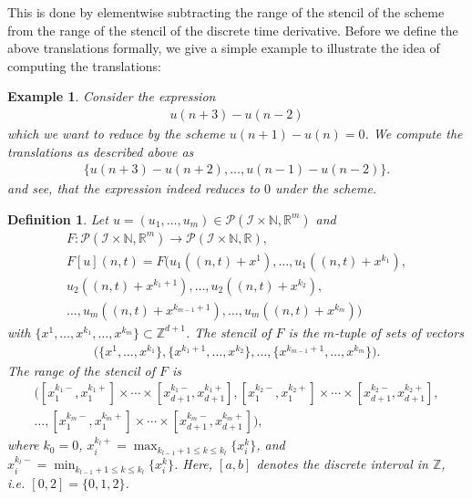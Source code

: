 \documentclass[manuscript]{acmart}
\newcommand{\Rr}{{\mathbb{R}}}
\newcommand{\Nn}{{\mathbb{N}}}
\newcommand{\Zz}{{\mathbb{Z}}}
\newcommand{\1}{{\chi}}
\newcommand{\Ii}{{\mathcal{I}}}
\numberwithin{equation}{section}
\theoremstyle{thmlemcorr}
\numberwithin{theorem}{section}
\theoremstyle{thmlemcorr*}
\theoremstyle{defi}
\newtheorem{definition}[theorem]{Definition}
\theoremstyle{remexample}
\newtheorem{example}[theorem]{Example}
\theoremstyle{ass}
\begin{document}
This is done by elementwise subtracting the range of the stencil of the scheme from the range of the stencil of the discrete time derivative. Before we define the above translations formally, we give a simple example to illustrate the idea of computing the translations:
\begin{example}
	Consider the expression
	\begin{gather*}
		u(n+3)-u(n-2)
	\end{gather*}
	which we want to reduce by the scheme $u(n+1)-u(n)=0$. We compute the translations as described above as
	\begin{gather*}
		\{u(n+3)-u(n+2),\dots,u(n-1)-u(n-2)\}.
	\end{gather*}
	and see, that the expression indeed reduces to $0$ under the scheme.
\end{example}
\begin{definition}
		Let $u=(u_1,\ldots,u_m)\in\mathcal{P}(\Ii\times\Nn,\Rr^m)$ and
		\begin{gather*}
			F:
				\mathcal{P}(\Ii\times\Nn,\Rr^m)\rightarrow\mathcal{P}(\Ii\times\Nn,\Rr),\\
				F[u](n,t)=F(u_1((n,t)+x^1),\ldots,u_1((n,t)+x^{k_1}),\\
				u_2((n,t)+x^{k_1+1}),
				\ldots,u_2((n,t)+x^{k_2}),\\
				\ldots,
				u_m((n,t)+x^{k_{m-1}+1}),\ldots,u_m((n,t)+x^{k_m}))
		\end{gather*}
	\normalsize
	with $\{x^1,\ldots,x^{k_1},\ldots,x^{k_m}\}\subset\Zz^{d+1}$.
	The \emph{stencil} of $F$ is the $m$-tuple of sets of vectors
	\begin{gather*}
		\Big(\big\{x^1,\ldots,x^{k_1}\big\},
		\big\{x^{k_1+1},\ldots,x^{k_2}\big\},
		\ldots,
		\big\{x^{k_{m-1}+1},\ldots,x^{k_m}\big\}\Big).
	\end{gather*}
	The \emph{range} of the stencil of $F$ is
		\begin{gather*}
		\Big([x_1^{k_1 -},x_1^{k_1 +}]\times\cdots\times[x_{d+1}^{k_1 -},x_{d+1}^{k_1 +}],
		[x_1^{k_2 -},x_1^{k_2 +}]\times\cdots\times[x_{d+1}^{k_2 -},x_{d+1}^{k_2 +}],
		\\	\dots,
		[x_1^{k_m -},x_1^{k_m +}]\times\cdots\times[x_{d+1}^{k_m -},x_{d+1}^{k_m +}]
		\Big),
	\end{gather*}
	where $k_0=0$, $x^{k_l +}_i = \max_{k_{l-1}+1\leq k\leq k_l}\{x_i^k\}$,
	and\\ $x^{k_l -}_i = \min_{k_{l-1}+1\leq k\leq k_l}\{x_i^k\}$. Here, $[a,b]$ denotes the discrete interval in $\Zz$, i.e. $[0,2]=\{0,1,2\}$.
	\end{definition}
\end{document}
